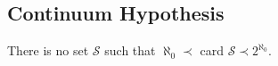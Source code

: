\subsection{Continuum Hypothesis}\label{continuum}

There is no set $\mathcal{S}$ such that $\aleph_0 \prec$ card $\mathcal{S} \prec 2^{\aleph_0}.$